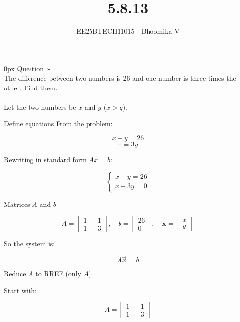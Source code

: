 \documentclass[journal]{IEEEtran}
\begin{document}

\vspace{3cm}

\title{5.8.13}
\author{EE25BTECH11015 - Bhoomika V}
{\let\newpage\relax\maketitle}

\renewcommand{\thefigure}{\theenumi}
\renewcommand{\thetable}{\theenumi}
\setlength{\intextsep}{10pt} %


\renewcommand{\thetable}{\theenumi}
\parindent 0px 
{Question :-} \\ 
The difference between two numbers is 26 and one number is three times the other. Find them.\\ 
\solution \\
Let the two numbers be $x$ and $y$ ($x > y$).

 Define equations
From the problem:

\[
x - y = 26
\]
\[
x = 3y
\]

Rewriting in standard form $Ax = b$:

\[
\begin{cases}
x - y = 26 \\
x - 3y = 0
\end{cases}
\]


 Matrices $A$ and $b$

\[
A = 
\begin{bmatrix}
1 & -1 \\
1 & -3
\end{bmatrix}, 
\quad
b = 
\begin{bmatrix}
26 \\
0
\end{bmatrix}, 
\quad
\mathbf{x} = 
\begin{bmatrix}
x \\ y
\end{bmatrix}
\]

So the system is:

\[
A \vec{x} = b
\]

 Reduce $A$ to RREF (only $A$)

Start with:

\[
A = 
\begin{bmatrix}
1 & -1 \\
1 & -3
\end{bmatrix}
\]
\end{document}
